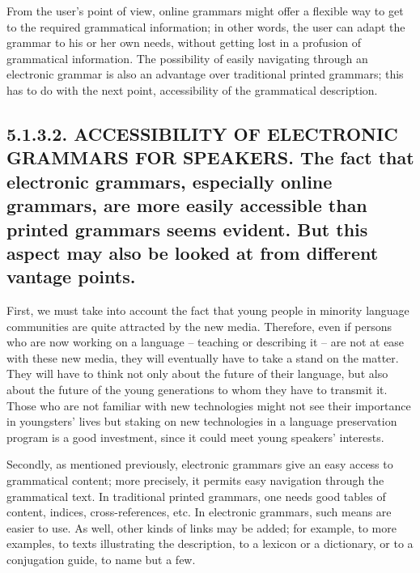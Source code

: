 \documentclass[letterpaper]{article}
\begin{document}
From the user{\textquoteright}s point of view, online grammars might offer a flexible way to get to the required grammatical information; in other words, the user can adapt the grammar to his or her own needs, without getting lost in a profusion of grammatical information. The possibility of easily navigating through an electronic grammar is also an advantage over traditional printed grammars; this has to do with the next point, accessibility of the grammatical description.

\subsection[5.1.3.2. ACCESSIBILITY OF ELECTRONIC GRAMMARS FOR SPEAKERS. The fact that electronic grammars, especially online grammars, are more easily accessible than printed grammars seems evident. But this aspect may also be looked at from different vantage points.]{5.1.3.2. ACCESSIBILITY OF ELECTRONIC GRAMMARS FOR SPEAKERS. \textmd{The fact that electronic grammars, especially online grammars, are more easily accessible}\textmd{ than printed grammars}\textmd{ seems evident. But this aspect may also be looked at from}\textmd{ different vantage points}\textmd{.}}
First, we must take into account the fact that young people in minority language communities are quite attracted by the new media. Therefore, even if persons who are now working on a language -- teaching or describing it {}-- are not at ease with these new media, they will eventually have to take a stand on the matter. They will have to think not only about the future of their language, but also about the future of the young generations to whom they have to transmit it. Those who are not familiar with new technologies might not see their importance in youngsters{\textquoteright} lives but staking on new technologies in a language preservation program is a good investment, since it could meet young speakers{\textquoteright} interests.

Secondly, as mentioned previously, electronic grammars give an easy access to grammatical content; more precisely, it permits easy navigation through the grammatical text. In traditional printed grammars, one needs good tables of content, indices, cross-references, etc. In electronic grammars, such means are easier to use. As well, other kinds of links may be added; for example, to more examples, to texts illustrating the description, to a lexicon or a dictionary, or to a conjugation guide, to name but a few. 
\end{document}

